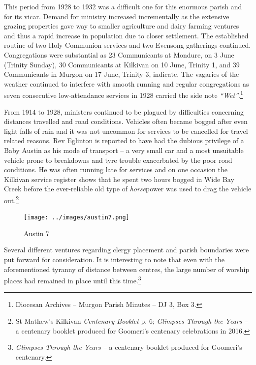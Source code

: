 This period from 1928 to 1932 was a difficult one for this enormous parish and for its vicar. Demand for ministry increased incrementally as the extensive grazing properties gave way to smaller agriculture and dairy farming ventures and thus a rapid increase in population due to closer settlement. The established routine of two Holy Communion services and two Evensong gatherings continued. Congregations were substantial as 23 Communicants at Mondure, on 3 June (Trinity Sunday), 30 Communicants at Kilkivan on 10 June, Trinity 1, and 39 Communicants in Murgon on 17 June, Trinity 3, indicate. The vagaries of the weather continued to interfere with smooth running and regular congregations as seven consecutive low-attendance services in 1928 carried the side note \emph{``Wet''}.\footnote{Diocesan Archives -- Murgon Parish Minutes -- DJ 3, Box 3.}


From 1914 to 1928, ministers continued to be plagued by difficulties concerning distances travelled and road conditions. Vehicles often became bogged after even light falls of rain and it was not uncommon for services to be cancelled for travel related reasons. Rev Eglinton is reported to have had the dubious privilege of a Baby Austin as his mode of transport -- a very small car and a most unsuitable vehicle prone to breakdowns and tyre trouble exacerbated by the poor road conditions. He was often running late for services and on one occasion the Kilkivan service register shows that he spent two hours bogged in Wide Bay Creek before the ever-reliable old type of \emph{horse}power was used to drag the vehicle out.\footnote{St Mathew's Kilkivan \emph{Centenary Booklet} p. 6; \emph{Glimpses Through the Years --} a centenary booklet produced for Goomeri's centenary celebrations in 2016.}








\begin{figure}[!htb]
\begin{center}
\texttt{[image: ../images/austin7.png]}
\caption{Austin 7}
\end{center}
\end{figure}




Several different ventures regarding clergy placement and parish boundaries were put forward for consideration. It is interesting to note that even with the aforementioned tyranny of distance between centres, the large number of worship places had remained in place until this time.\footnote{\emph{Glimpses Through the Years --} a centenary booklet produced for Goomeri's centenary.}


